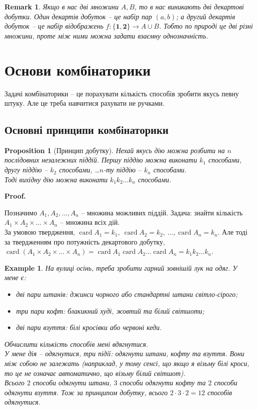 \documentclass[a4paper, 14pt]{extarticle}
\makeatletter
\theoremstyle{theoremdd}
\theoremstyle{theoremdd}
\theoremstyle{theoremdd}
\theoremstyle{theoremdd}
\theoremstyle{theoremdd}
\newtheorem{example}[theorem]{Example}
\theoremstyle{theoremdd}
\theoremstyle{theoremdd}
\theoremstyle{theoremdd}
\theoremstyle{theoremdd}
\newtheorem{proposition}[theorem]{Proposition}
\theoremstyle{theoremdd}
\theoremstyle{theoremdd}
\newtheorem{remark}[theorem]{Remark}
\theoremstyle{theoremdd}
\theoremstyle{theoremdd}
\theoremstyle{theoremdd}
\theoremstyle{theoremdd}
\renewenvironment{proof}[1][Proof.\\]{\par
\pushQED{\hfill \qed}%
\normalfont \topsep6\p@\@plus6\p@\relax
\trivlist
\item\relax
{\bfseries
#1\@addpunct{.}}\hspace\labelsep\ignorespaces
}{%
\popQED\endtrivlist\@endpefalse
}
\DeclareMathOperator{\card}{card}
\makeatother
\begin{document}
\begin{remark}
Якщо в нас дві множини $A,B$, то в нас виникають дві декартові добутки. Один декартів добуток -- це набір пар $(a,b)$; а другий декартів добуток -- це набір відображень $f \colon \{\textbf{1}, \textbf{2}\} \to A \cup B$. Тобто по природі це дві різні множини, проте між ними можна задати взаємну однозначність.
\end{remark}
\newpage

\section{Основи комбінаторики}
Задачі комбінаторики -- це порахувати кількість способів зробити якусь певну штуку. Але це треба навчитися рахувати не ручками.

\subsection{Основні принципи комбінаторики}
\begin{proposition}[Принцип добутку]
Нехай якусь дію можна розбити на $n$ послідовних незалежних піддій. Першу піддію можна виконати $k_1$ способами, другу піддію -- $k_2$ способами, \dots $n$-ту піддію -- $k_n$ способами.\\
Тоді вихідну дію можна виконати $k_1 k_2 \dots k_n$ способами.
\end{proposition}

\begin{proof}
Позначимо $A_1,A_2,\dots,A_n$ -- множина можливих піддій. Задача: знайти кількість $A_1 \times A_2 \times \dots \times A_n$ -- множина всіх дій. \\
За умовою твердження, $\card A_1 = k_1,\ \card A_2 = k_2,\ \dots, \card A_n = k_n$. Але тоді за твердженням про потужність декартового добутку,\\
$\card(A_1 \times A_2 \times \dots \times A_n) = \card A_1 \card A_2 \dots \card A_n = k_1 k_2 \dots k_n$.
\end{proof}

\begin{example}
На вулиці осінь, треба зробити гарний зовнішій лук на одяг. У мене є:
\begin{itemize}[nosep, wide=0pt, label={-}]
\item дві пари штанів: джинси чорного або стандартні штани світло-сірого;
\item три пари кофт: блакикний худі, жовтий та білий світшоти;
\item дві пари взуття: білі кросівки або червоні кеди.
\end{itemize}
Обчислити кількість способів мені вдягнутися.
\bigskip \\
У мене дія -- одягнутися, три підії: одягнути штани, кофту та взуття. Вони між собою не залежать (наприклад, у тому сенсі, що якщо я візьму білі кроси, то це не означає автоматично, що візьму білий світшот).\\
Всього $2$ способи одягнути штани, $3$ способи одягнути кофту та $2$ способи одягнути взуття. Тож за принципом добутку, всього $2 \cdot 3 \cdot 2 = 12$ способів одягнутися.
\end{example}
\end{document}
